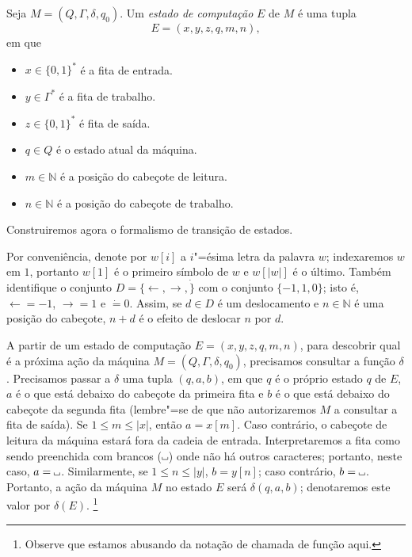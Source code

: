 \begin{definition}
    Seja $M = (Q, \Gamma, \delta, q_0)$.
    Um \emph{estado de computação} $E$ de $M$ é uma tupla
    \begin{equation*}
        E = (x, y, z, q, m, n),
    \end{equation*}
    em que
    \begin{itemize}
        \setlength{\labelsep}{1ex}
        \item $x \in \{0, 1\}^*$ é a fita de entrada.
        \item $y \in \Gamma^*$ é a fita de trabalho.
        \item $z \in \{0, 1\}^*$ é fita de saída.
        \item $q \in Q$ é o estado atual da máquina.
        \item $m \in \mathbb N$ é a posição do cabeçote de leitura.
        \item $n \in \mathbb N$ é a posição do cabeçote de trabalho.
    \end{itemize}
\end{definition}

Construiremos agora o formalismo de transição de estados.

Por conveniência, denote por $w[i]$ a $i$"=ésima letra da palavra $w$;
indexaremos $w$ em $1$,
portanto $w[1]$ é o primeiro símbolo de $w$ e $w[|w|]$ é o último.
Também identifique o conjunto $D = \{\leftarrow, \rightarrow, \dot\}$
com o conjunto $\{-1, 1, 0\}$;
isto é, $\leftarrow = -1$, $\rightarrow = 1$ e $\dot = 0$.
Assim, se $d \in D$ é um deslocamento
e $n \in \mathbb N$ é uma posição do cabeçote,
$n + d$ é o efeito de deslocar $n$ por $d$.

A partir de um estado de computação $E = (x, y, z, q, m, n)$,
para descobrir qual é a próxima ação da máquina $M = (Q, \Gamma, \delta, q_0)$,
precisamos consultar a função $\delta$.
Precisamos passar a $\delta$ uma tupla $(q, a, b)$,
em que $q$ é o próprio estado $q$ de $E$,
$a$ é o que está debaixo do cabeçote da primeira fita
e $b$ é o que está debaixo do cabeçote da segunda fita
(lembre"=se de que não autorizaremos $M$ a consultar a fita de saída).
Se $1 \leq m \leq |x|$,
então $a = x[m]$.
Caso contrário, o cabeçote de leitura da máquina
estará fora da cadeia de entrada.
Interpretaremos a fita como sendo preenchida com brancos ($\B$)
onde não há outros caracteres;
portanto, neste caso, $a = \B$.
Similarmente, se $1 \leq n \leq |y|$, $b = y[n]$; caso contrário, $b = \B$.
Portanto,
a ação da máquina $M$ no estado $E$
será $\delta(q, a, b)$;
denotaremos este valor por $\delta(E)$.%
\footnote{
    Observe que estamos abusando da notação de chamada de função aqui.
}

